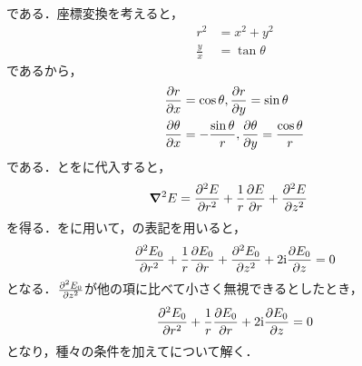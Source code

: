 \documentclass{report}
\begin{document}
        である．座標変換を考えると，
        \begin{align}
          r^2 &= x^2 + y^2 \\ 
          \frac{y}{x} &= \tan\theta 
        \end{align}
        であるから，
        \begin{align}
          &\pdv{r}{x} = \cos \theta, \pdv{r}{y} = \sin \theta \label{div-x-y-r-t-1} \\
          &\pdv{\theta}{x} = -\frac{\sin \theta}{r}, \pdv{\theta}{y} = \frac{\cos \theta}{r}\label{div-x-y-r-t-2}
        \end{align}
        である．とをに代入すると，
        \begin{align}
          \grad^2 E &= \pdv[2]{E}{r} + \frac{1}{r}\pdv{E}{r} + \pdv[2]{E}{z} \label{laplacian-2}
        \end{align}
        を得る．をに用いて，の表記を用いると，
        \begin{align}
          \pdv[2]{E_0}{r} + \frac{1}{r}\pdv{E_0}{r} + \pdv[2]{E_0}{z} + 2\mathrm{i}\pdv{E_0}{z} = 0
        \end{align}
        となる．$\pdv[2]{E_0}{z}$が他の項に比べて小さく無視できるとしたとき，
        \begin{align}
          \pdv[2]{E_0}{r} + \frac{1}{r}\pdv{E_0}{r} + 2\mathrm{i}\pdv{E_0}{z} = 0 \label{maxwell-electro-field}
        \end{align}
        となり，種々の条件を加えてについて解く．
\end{document}
